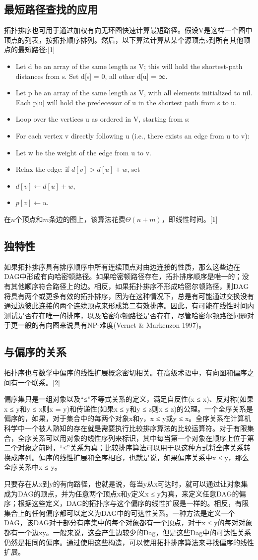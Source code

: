 \subsection{最短路径查找的应用}
拓扑排序也可用于通过加权有向无环图快速计算最短路径。假设V是这样一个图中顶点的列表，按拓扑顺序排列。然后，以下算法计算从某个源顶点$s$到所有其他顶点的最短路径:[1]
\begin{itemize}
\item Let d be an array of the same length as V; this will hold the shortest-path distances from s. Set d[s] = 0, all other d[u] = ∞.
\item Let p be an array of the same length as V, with all elements initialized to nil. Each p[u] will hold the predecessor of u in the shortest path from s to u.
\item Loop over the vertices u as ordered in V, starting from s:
\item For each vertex v directly following u (i.e., there exists an edge from u to v):
\item Let w be the weight of the edge from u to v.
\item Relax the edge: if $d[v] > d[u] + w$, set
\item $d[v] \longleftarrow d[u] + w$,
\item $p[v] \longleftarrow u$.
\end{itemize}
在$n$个顶点和$m$条边的图上，该算法花费$\Theta(n + m)$，即线性时间。[1]

\subsection{独特性}
如果拓扑排序具有排序顺序中所有连续顶点对由边连接的性质，那么这些边在DAG中形成有向哈密顿路径。如果哈密顿路径存在，拓扑排序顺序是唯一的；没有其他顺序符合路径上的边。相反，如果拓扑排序不形成哈密尔顿路径，则DAG将具有两个或更多有效的拓扑排序，因为在这种情况下，总是有可能通过交换没有通过边彼此连接的两个连续顶点来形成第二有效排序。因此，有可能在线性时间内测试是否存在唯一的排序，以及哈密尔顿路径是否存在，尽管哈密尔顿路径问题对于更一般的有向图来说具有NP-难度(Vernet & Markenzon 1997)。

\subsection{与偏序的关系}
拓扑序也与数学中偏序的线性扩展概念密切相关。在高级术语中，有向图和偏序之间有一个联系。[2]

偏序集只是一组对象以及“≤”不等式关系的定义，满足自反性(x ≤ x)、反对称(如果x ≤ y和y ≤ x则x = y)和传递性(如果x ≤ y和y ≤ z则x ≤ z)的公理。一个全序关系是偏序的，如果，对于集合中的每两个对象x和y，x ≤ y或y ≤ x。全序关系在计算机科学中一个被人熟知的存在就是需要执行比较排序算法的比较运算符。对于有限集合，全序关系可以用对象的线性序列来标识，其中每当第一个对象在顺序上位于第二个对象之前时，“≤”关系为真；比较排序算法可以用于以这种方式将全序关系转换成序列。偏序的线性扩展和全序相容，也就是说，如果偏序关系中x ≤ y，那么全序关系中x ≤ y。

只要存在从x到y的有向路径，也就是说，每当y从x可达时，就可以通过让对象集成为DAG的顶点，并为任意两个顶点x和y定义x ≤ y为真，来定义任意DAG的偏序；根据这些定义，DAG的拓扑序与这个偏序的线性扩展是一样的。相反，有限集合上的任何偏序都可以定义为DAG中的可达性关系。一种方法是定义一个DAG，该DAG对于部分有序集中的每个对象都有一个顶点，对于x ≤ y的每对对象都有一个边xy。一般来说，这会产生边较少的Dag，但是这些Dag中的可达性关系仍然是相同的偏序。通过使用这些构造，可以使用拓扑排序算法来寻找偏序的线性扩展。